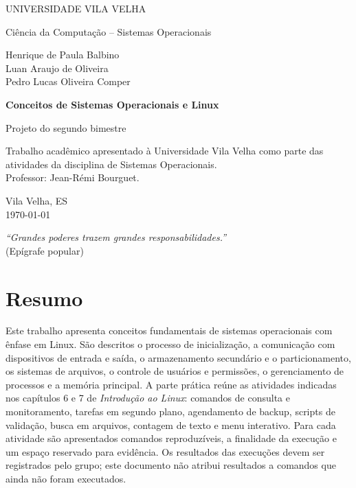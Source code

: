\documentclass[12pt,a4paper,oneside]{article}
\newcommand{\integrantes}{Henrique de Paula Balbino\\Luan Araujo de Oliveira\\Pedro Lucas Oliveira Comper}
\begin{document}
\thispagestyle{empty}
\begin{center}
{\large UNIVERSIDADE VILA VELHA\par}\vspace{0.2cm}
{\large Ciência da Computação -- Sistemas Operacionais\par}\vspace{2cm}
{\large\integrantes\par}\vspace{2.5cm}
{\Large\bfseries Conceitos de Sistemas Operacionais e Linux\par}\vspace{0.4cm}
Projeto do segundo bimestre
\end{center}
\vspace{1.5cm}
\begin{flushright}\begin{minipage}{0.55\textwidth}
Trabalho acadêmico apresentado à Universidade Vila Velha como parte das atividades da disciplina de Sistemas Operacionais.\\[0.4cm]
Professor: Jean-Rémi Bourguet.
\end{minipage}\end{flushright}
\vfill\begin{center}Vila Velha, ES\\\today\end{center}
\clearpage

\thispagestyle{empty}\vspace*{5cm}
\begin{flushright}\textit{“Grandes poderes trazem grandes responsabilidades.”}\\(Epígrafe popular)\end{flushright}
\clearpage

\section*{Resumo}
Este trabalho apresenta conceitos fundamentais de sistemas operacionais com ênfase em Linux. São descritos o processo de inicialização, a comunicação com dispositivos de entrada e saída, o armazenamento secundário e o particionamento, os sistemas de arquivos, o controle de usuários e permissões, o gerenciamento de processos e a memória principal. A parte prática reúne as atividades indicadas nos capítulos 6 e 7 de \textit{Introdução ao Linux}: comandos de consulta e monitoramento, tarefas em segundo plano, agendamento de backup, scripts de validação, busca em arquivos, contagem de texto e menu interativo. Para cada atividade são apresentados comandos reproduzíveis, a finalidade da execução e um espaço reservado para evidência. Os resultados das execuções devem ser registrados pelo grupo; este documento não atribui resultados a comandos que ainda não foram executados.
\end{document}
